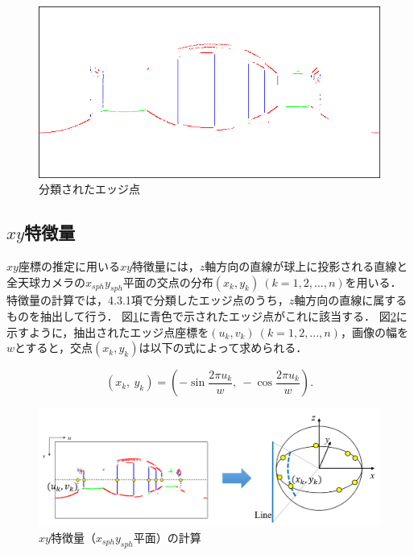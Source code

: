 \begin{figure}[b]
 \begin{center}
 \includegraphics[width=0.7\columnwidth]{./chap4/fig/edge_inlier.png}
 \caption{分類されたエッジ点}
 \label{fig:classified}
 \end{center}
\end{figure}

\clearpage

\subsection{$xy$特徴量}

$xy$座標の推定に用いる$xy$特徴量には，$z$軸方向の直線が球上に投影される直線と全天球カメラの$x_{sph}y_{sph}$平面の交点の分布$(x_k,y_k)\ (k=1, 2,..., n)$を用いる．
特徴量の計算では，4.3.1項で分類したエッジ点のうち，$z$軸方向の直線に属するものを抽出して行う．
図\ref{fig:classified}に青色で示されたエッジ点がこれに該当する．
図\ref{fig:feature_xy}に示すように，抽出されたエッジ点座標を$(u_k, v_k)\ (k=1, 2,..., n)$，画像の幅を$w$とすると，交点$(x_k,y_k)$は以下の式によって求められる．

\begin{equation}
   \left(x_k,\ y_k\right) = \left(-\sin\frac{2\pi u_k}{w},\ -\cos\frac{2\pi u_k}{w}\right).
\end{equation}

\begin{figure}[b]
 \begin{center}
 \includegraphics[width=1.0\columnwidth]{./chap4/fig/feature_xy.png}
 \vspace{5mm}
 \caption{$xy$特徴量（$x_{sph}y_{sph}$平面）の計算}
 \label{fig:feature_xy}
 \end{center}
\end{figure}

